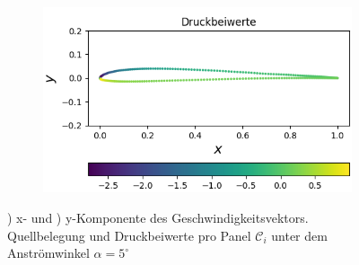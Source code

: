 \begin{figure}[!ht]
\begin{subfigure}[b]{0.475\linewidth}
    \caption{\label{fig:zoneq}}
  \end{subfigure}
  \hfill
  \begin{subfigure}[b]{0.475\linewidth}
    \centering\includegraphics[scale=0.5]{figures/zone40cp.png} 
    \caption{\label{fig:zonecp}}
  \end{subfigure}
  
  \caption{) x- und ) y-Komponente des Geschwindigkeitsvektors.  Quellbelegung und  Druckbeiwerte pro Panel $\mathcal{C}_{i}$ unter dem Anströmwinkel $\alpha =5^{\circ}$}
\end{figure}


\newpage
